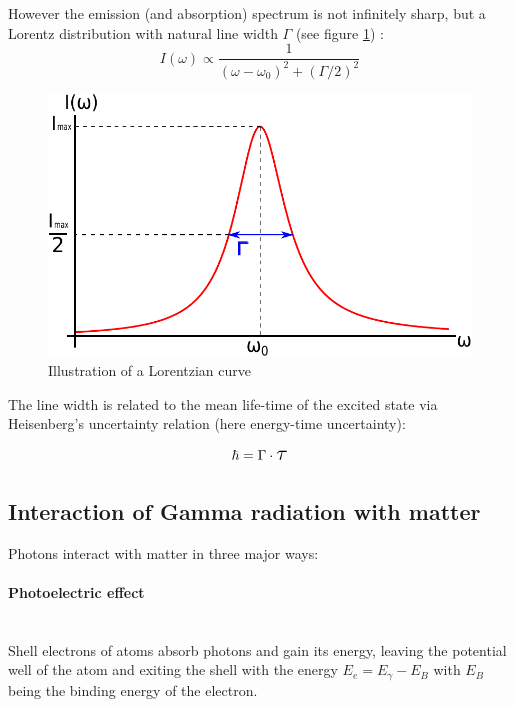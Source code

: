 However the emission (and absorption) spectrum is not infinitely sharp, but a Lorentz distribution with natural line width $\Gamma$ (see figure \ref{fig:principles:lorentz}) \cite{Wegener}: 
\begin{equation}
I(\omega) \propto \frac{1}{(\omega-\omega_0)^2+(\Gamma /2)^2}
\label{eq:principles:Lorentz}
\end{equation}
\begin{figure}[H]
	\centering
	\includegraphics[height=0.25\textheight]{graphics/Lorentz.pdf}
	\caption[Lorentz distribution]{Illustration of a Lorentzian curve}
	\label{fig:principles:lorentz}
\end{figure}

 The line width is related to the mean life-time \scalebox{1.5}{$\tau$} of the excited state via Heisenberg's uncertainty relation (here energy-time uncertainty):
 
 \begin{equation}
 \hbar=\Gamma \cdot \scalebox{1.5}{$\tau$}
 \end{equation}

\subsection{Interaction of Gamma radiation with matter}
Photons interact with matter in three major ways\cite{Demtröder}:

\paragraph{Photoelectric effect} \ \\
Shell electrons of atoms absorb photons and gain its energy, leaving the potential well of the atom and exiting the shell with the energy $E_e = E_\gamma-E_B$ with $E_B$ being the binding energy of the electron.
